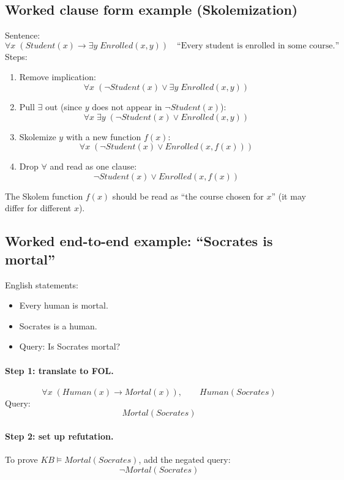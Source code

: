 \documentclass[11pt]{article}
\begin{document}
\subsection{Worked clause form example (Skolemization)}
Sentence:
\[
  \forall x\; (Student(x) \rightarrow \exists y\; Enrolled(x,y))
  \quad\text{``Every student is enrolled in some course.''}
\]
Steps:
\begin{enumerate}[leftmargin=*]
  \item Remove implication:
  \[
    \forall x\; (\lnot Student(x) \lor \exists y\; Enrolled(x,y))
  \]
  \item Pull $\exists$ out (since $y$ does not appear in $\lnot Student(x)$):
  \[
    \forall x\; \exists y\; (\lnot Student(x) \lor Enrolled(x,y))
  \]
  \item Skolemize $y$ with a new function $f(x)$:
  \[
    \forall x\; (\lnot Student(x) \lor Enrolled(x,f(x)))
  \]
  \item Drop $\forall$ and read as one clause:
  \[
    \lnot Student(x) \lor Enrolled(x,f(x))
  \]
\end{enumerate}
The Skolem function $f(x)$ should be read as ``the course chosen for $x$'' (it may differ for different $x$).

\subsection{Worked end-to-end example: ``Socrates is mortal''}
English statements:
\begin{itemize}[leftmargin=*]
  \item Every human is mortal.
  \item Socrates is a human.
  \item Query: Is Socrates mortal?
\end{itemize}

\paragraph{Step 1: translate to FOL.}
\[
  \forall x\; (Human(x) \rightarrow Mortal(x)),\qquad Human(Socrates)
\]
Query:
\[
  Mortal(Socrates)
\]

\paragraph{Step 2: set up refutation.}
To prove $KB \models Mortal(Socrates)$, add the negated query:
\[
  \lnot Mortal(Socrates)
\]
\end{document}
